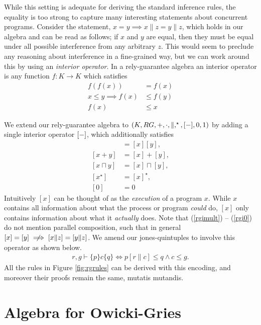 \documentclass{llncs}
\begin{document}
While this setting is adequate for deriving the standard inference
rules, the equality is too strong to capture many interesting
statements about concurrent programs. Consider the statement,
$x = y \implies x\|z = y\|z$,
which holds in our algebra and can be read as follows; if $x$ and $y$ are
equal, then they must be equal under all possible interference from
any arbitrary $z$. This would seem to preclude any reasoning about
interference in a fine-grained way, but we can work around this by
using an \emph{interior operator}. In a rely-guarantee algebra an
interior operator is any function $f : K \to K$ which satisfies
\begin{align*}
f(f(x)) &= f(x) \tag{$f$ is idempotent}\\
x \le y \implies f(x) &\le f(y) \tag{$f$ is isotone}\\
f(x) &\le x \tag{$f$ is coextensive}
\end{align*}

We extend our rely-guarantee algebra to
$(K,RG,+,\cdot,\|,^\star,[\--],0,1)$ by adding a single interior
operator $[\--]$, which additionally satisfies
\begin{align}
[xy] &= [x][y], \label{rgimult}\\
[x + y] &= [x] + [y],\\
[x \sqcap y] &= [x] \sqcap [y],\\
[x^\star] &= [x]^\star,\\
[0] &= 0 \label{rgi0}
\end{align}
Intuitively $[x]$ can be thought of as the \emph{execution} of a
program $x$. While $x$ contains all information about what the process
or program \emph{could} do, $[x]$ only contains information about what
it \emph{actually} does. Note that (\ref{rgimult}) -- (\ref{rgi0}) do
not mention parallel composition, such that in general $[x] = [y]
\centernot\implies [x\|z] = [y\|z]$. We amend our jones-quintuples to
involve this operator as shown below.
\begin{align*}
r,g \vdash \{p\} c \{q\} \iff p[r\|c] \le q \land c \le g.
\end{align*}
All the rules in Figure \ref{fig:rgrules} can be derived with this
encoding, and moreover their proofs remain the same, mutatis
mutandis.

\newpage
\section{Algebra for Owicki-Gries}
\label{sec:OG}
\end{document}
